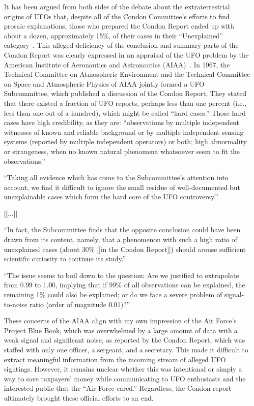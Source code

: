 It has been argued from both sides of the debate about the extraterrestrial origins of UFOs that,
despite all of the Condon Committee's efforts to find prosaic explanations, those who prepared the Condon Report
ended up with about a dozen, approximately 15{\%},
of their cases in their ``Unexplained'' category~\cite{Klass2019Apr,Hynek_1969,Page_1969,McDonald-Condon-69,Sturrock-Condon-87}.
This alleged deficiency of the conclusion and summary parts of the Condon Report was clearly expressed in an appraisal of the
UFO problem by the American Institute of Aeronautics and Astronautics (AIAA)~\cite{AA-Condon-1970}.
In 1967, the Technical Committee on Atmospheric Environment and the Technical Committee on Space and Atmospheric Physics of AIAA
jointly formed a UFO Subcommittee, which published a discussion of the Condon Report.
They stated that there existed a fraction of UFO reports, perhaps less than one percent (i.e., less than one out of a hundred),
which might be called ``hard cases.'' Those hard cases have high credibility, as they are:
``observations by multiple independent witnesses of known and reliable background or by multiple independent sensing systems
(reported by multiple independent operators) or both; high abnormality or strangeness,
when no known natural phenomena whatsoever seem to fit the observations.''
\begin{svgraybox}
``Taking all evidence which has come to the Subcommittee's attention into account,
we find it difficult to ignore the small residue of
well-documented but unexplainable cases which form the hard core of the UFO controversy.''

[[$\ldots$]]

``In fact, the Subcommittee finds that the opposite conclusion could have been drawn from its content, namely,
that a phenomenon with such a high ratio of unexplained cases (about 30{\%}
[[in the Condon Report]])
should arouse sufficient scientific curiosity to continue its study.''

``The issue seems to boil down to the question:
Are we justified to extrapolate from 0.99 to 1.00, implying that if 99{\%}
of all observations can be explained, the remaining 1{\%}
could also be explained; or do we face a severe problem of signal-to-noise ratio
(order of magnitude 0.01)?''
\end{svgraybox}

These concerns of the AIAA align with my own impression of the Air Force's Project Blue Book, which was overwhelmed by a large amount of data with a weak signal and significant noise, as reported by the Condon Report, which was staffed with only one officer, a sergeant, and a secretary. This made it difficult to extract meaningful information from the incoming stream of alleged UFO sightings. However, it remains unclear whether this was intentional or simply a way to save taxpayers' money while communicating to UFO enthusiasts and the interested public that the ``Air Force cared.'' Regardless, the Condon report ultimately brought these official efforts to an end.



